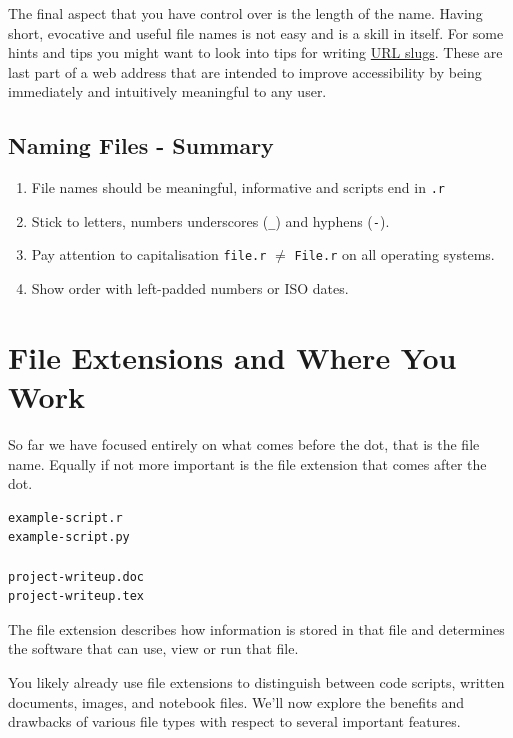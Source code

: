 \documentclass[
  letterpaper,
  DIV=11,
  numbers=noendperiod]{scrreprt}
\begin{document}
The final aspect that you have control over is the length of the name.
Having short, evocative and useful file names is not easy and is a skill
in itself. For some hints and tips you might want to look into tips for
writing
\href{https://stackoverflow.com/questions/4230846/what-is-the-etymology-of-slug-in-a-url}{URL
slugs}. These are last part of a web address that are intended to
improve accessibility by being immediately and intuitively meaningful to
any user.

\subsection{Naming Files - Summary}\label{naming-files---summary}

\begin{enumerate}
\def\labelenumi{\arabic{enumi}.}
\item
  File names should be meaningful, informative and scripts end in
  \texttt{.r}
\item
  Stick to letters, numbers underscores (\texttt{\_}) and hyphens
  (\texttt{-}).
\item
  Pay attention to capitalisation \texttt{file.r} \(\neq\)
  \texttt{File.r} on all operating systems.
\item
  Show order with left-padded numbers or ISO dates.
\end{enumerate}

\section{File Extensions and Where You
Work}\label{file-extensions-and-where-you-work}

So far we have focused entirely on what comes before the dot, that is
the file name. Equally if not more important is the file extension that
comes after the dot.

\begin{verbatim}
example-script.r
example-script.py

project-writeup.doc
project-writeup.tex
\end{verbatim}

The file extension describes how information is stored in that file and
determines the software that can use, view or run that file.

You likely already use file extensions to distinguish between code
scripts, written documents, images, and notebook files. We'll now
explore the benefits and drawbacks of various file types with respect to
several important features.
\end{document}
